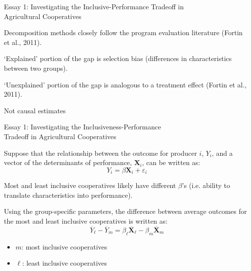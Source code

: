 \documentclass[aspectratio=169]{beamer}
\newenvironment{wideitemize}{\itemize\addtolength{\itemsep}{10pt}}{\enditemize}
\begin{document}
\begin{frame}{Essay 1: Investigating the Inclusive-Performance Tradeoff in \\ \hspace{1.7cm} Agricultural Cooperatives}
    \begin{wideitemize}
        \item Decomposition methods closely follow the program evaluation literature (Fortin et al., 2011). 
        \item `Explained' portion of the gap is selection bias (differences in characteristics between two groups).
        \item ‘Unexplained’ portion of the gap is analogous to a treatment effect (Fortin et al., 2011). \vspace{.25cm}
            \begin{wideitemize}
                \item Not causal estimates
            \end{wideitemize}
    \end{wideitemize}
\end{frame}

\begin{frame}{Essay 1: Investigating the Inclusiveness-Performance \\ \hspace{1.7cm} Tradeoff in Agricultural Cooperatives}
    \begin{wideitemize}
        \item Suppose that the relationship between the outcome for producer $i$, $Y_i$, and a vector of the determinants of performance, $\mathbf{X}_i$, can be written as: \vspace{.25cm}
            \begin{equation} \label{eq:E1_1}
                Y_i = \beta \mathbf{X}_i + \varepsilon_i 
            \end{equation} 
        \item Most and least inclusive cooperatives likely have different $\beta$'s (i.e. ability to translate characteristics into performance). 
        \item Using the group-specific parameters, the difference between average outcomes for the most and least inclusive cooperatives is written as: \vspace{.25cm}
            \begin{equation} \label{eq:E1_2}
                \overline{Y}_{\ell} - \overline{Y}_{m} =  \beta_{\ell}\overline{\mathbf{X}}_{\ell} - \beta_{m}\overline{\mathbf{X}}_{m}
            \end{equation}  
            \begin{itemize}
                \item $m$: most inclusive cooperatives
                \item $\ell$: least inclusive cooperatives 
            \end{itemize}
    \end{wideitemize}
\end{frame}
\end{document}
